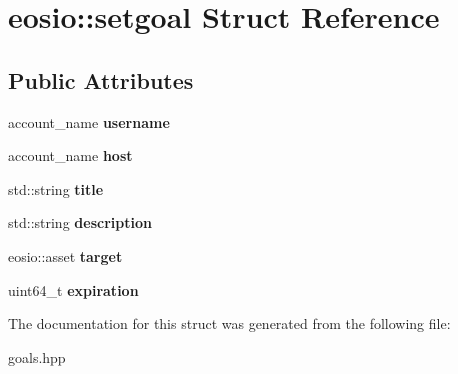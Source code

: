\hypertarget{structeosio_1_1setgoal}{}\section{eosio\+:\+:setgoal Struct Reference}
\label{structeosio_1_1setgoal}
\subsection*{Public Attributes}
\begin{DoxyCompactItemize}
\item 
\mbox{\label{structeosio_1_1setgoal_a1666e07361017340d50881e05fff2c8a}} 
account\+\_\+name {\bfseries username}
\item 
\mbox{\label{structeosio_1_1setgoal_a60194b8f13162b76e2ba5290aeed4a22}} 
account\+\_\+name {\bfseries host}
\item 
\mbox{\label{structeosio_1_1setgoal_a91b3c0d3271ee931a5395ac298fb62b1}} 
std\+::string {\bfseries title}
\item 
\mbox{\label{structeosio_1_1setgoal_a8d227bbf15ac85c51710931ec6b85309}} 
std\+::string {\bfseries description}
\item 
\mbox{\label{structeosio_1_1setgoal_a2290e6aae5df66d43f17791838b27a1e}} 
eosio\+::asset {\bfseries target}
\item 
\mbox{\label{structeosio_1_1setgoal_a458113c60961f51569bc9d732d4169e8}} 
uint64\+\_\+t {\bfseries expiration}
\end{DoxyCompactItemize}


The documentation for this struct was generated from the following file\+:\begin{DoxyCompactItemize}
\item 
goals.\+hpp\end{DoxyCompactItemize}
